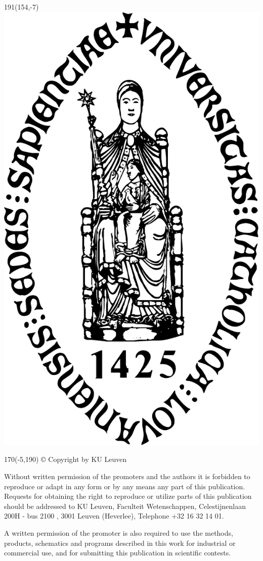 \documentclass[12pt,a4paper,oneside]{reedthesis}
\begin{document}
\begin{textblock}{191}(154,-7)
\textblockcolour{}
\includegraphics*[height=16.5truemm]{sedes}
\end{textblock}
%
\begin{textblock}{170}(-5,190)
\textblockcolour{}
\vspace{-\parskip}
© Copyright by KU Leuven

Without written permission of the promoters and the authors it is forbidden to reproduce or adapt in any form or by any means any part of this publication. Requests for obtaining the right to reproduce or utilize parts of this publication should be addressed to KU Leuven, Faculteit Wetenschappen, Celestijnenlaan 200H - bus 2100 , 3001 Leuven (Heverlee), Telephone +32 16 32 14 01.

A written permission of the promoter is also required to use the methods, products, schematics and programs described in this work for industrial or commercial use, and for submitting this publication in scientific contests.
\end{textblock}
\end{document}
